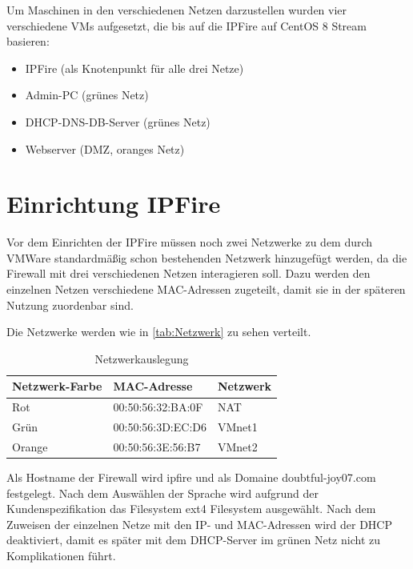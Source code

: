 \documentclass[a4paper,
    11pt,
    headings=small,
    ngerman,
    listof=totoc,
    numbers=noenddot]{scrreprt}[2021/11/13]
\begin{document}
Um Maschinen in den verschiedenen Netzen darzustellen wurden vier verschiedene \acp{VM} aufgesetzt, die bis auf die IPFire auf CentOS 8 Stream basieren:

\begin{itemize}
  \item IPFire (als Knotenpunkt für alle drei Netze)
  \item Admin-PC (grünes Netz)
  \item \acs{DHCP}-\acs{DNS}-\acs{DB}-Server (grünes Netz)
  \item Webserver (\ac{DMZ}, oranges Netz)
\end{itemize}



\section{Einrichtung IPFire}

Vor dem Einrichten der IPFire müssen noch zwei Netzwerke zu dem durch VMWare standardmäßig schon bestehenden Netzwerk hinzugefügt werden, da die Firewall mit drei verschiedenen Netzen interagieren soll. Dazu werden den einzelnen Netzen verschiedene MAC-Adressen zugeteilt, damit sie in der späteren Nutzung zuordenbar sind.

Die Netzwerke werden wie in \vref{tab:Netzwerk} zu sehen verteilt.

\begin{table}[htbp]
  \centering
  \renewcommand{\arraystretch}{1.25}
  \caption{Netzwerkauslegung}
  \begin{tabular}{lll}
    Netzwerk-Farbe & MAC-Adresse       & Netzwerk \\
    \hline
    Rot            & 00:50:56:32:BA:0F & NAT      \\
    Grün           & 00:50:56:3D:EC:D6 & VMnet1   \\
    Orange         & 00:50:56:3E:56:B7 & VMnet2   \\
  \end{tabular}
  \label{tab:Netzwerk}
\end{table}

Als Hostname der Firewall wird \glqq{}ipfire\grqq{} und als Domaine \glqq{}doubtful-joy07.com\grqq{} festgelegt.
Nach dem Auswählen der Sprache wird aufgrund der Kundenspezifikation das Filesystem \glqq{}ext4 Filesystem\grqq{} ausgewählt. Nach dem Zuweisen der einzelnen Netze mit den IP- und MAC-Adressen wird der \ac{DHCP} deaktiviert, damit es später mit dem \ac{DHCP}-Server im grünen Netz nicht zu Komplikationen führt.
\end{document}
